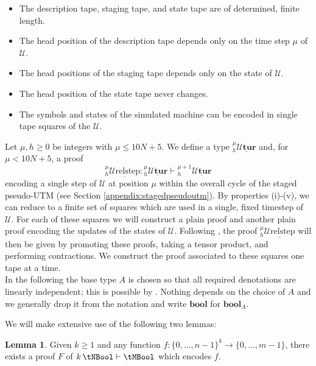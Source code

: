 \documentclass[english,letter paper,12pt,reqno]{article}
\theoremstyle{definition}
\newtheorem{lemma}[theorem]{Lemma}
\begin{document}
\begin{itemize}
    \item[(i)] The description tape, staging tape, and state tape are of determined, finite length.
    \item[(ii)] The head position of the description tape depends only on the time step $\mu$ of $\mathcal{U}$.
    \item[(iii)] The head positions of the staging tape depends only on the state of $\mathcal{U}$.
    \item[(iv)] The head position of the state tape never changes.
    \item[(v)] The symbols and states of the simulated machine can be encoded in single tape squares of the $\mathcal{U}$.
\end{itemize}
Let $\mu, h \geq 0$ be integers with $\mu \leq 10N+5$. We define a type ${}_h^\mu\underline{\mathcal{U}\textbf{tur}}$ and, for $\mu < 10N+5$, a proof
\begin{equation}
    {}_h^{\mu}\underline{\text{$\mathcal{U}$relstep}}: {}_h^\mu\underline{\mathcal{U}\textbf{tur}} \vdash {}_h^{\mu+1}\underline{\mathcal{U}\textbf{tur}}
\end{equation}
encoding a single step of $\mathcal{U}$ at position $\mu$ within the overall cycle of the staged pseudo-UTM (see Section \ref{appendix:stagedpseudoutm}). By properties (i)-(v), we can reduce to a finite set of squares which are used in a single, fixed timestep of $\mathcal{U}$. For each of these squares we will construct a plain proof and another plain proof encoding the updates of the states of $\mathcal{U}$. Following \cite{clift2020encodings}, the proof ${}_h^{\mu}\underline{\text{$\mathcal{U}$relstep}}$ will then be given by promoting these proofs, taking a tensor product, and performing contractions. We construct the proof associated to these squares one tape at a time. 
\\

In the following the base type $A$ is chosen so that all required denotations are linearly independent; this is possible by \cite[Appendix B]{clift2020encodings}. Nothing depends on the choice of $A$ and we generally drop it from the notation and write $\textbf{bool}$ for $\textbf{bool}_A$.

We will make extensive use of the following two lemmas:

\begin{lemma}\label{encoding functions of n bools mod}
Given $k \ge 1$ and any function $f: \{0, ..., n-1\}^k \to \{0, ..., m-1\}$, there exists a proof $F$ of $k\,\tNBool \vdash \tMBool$ which encodes $f$.
\end{lemma} 
\end{document}
